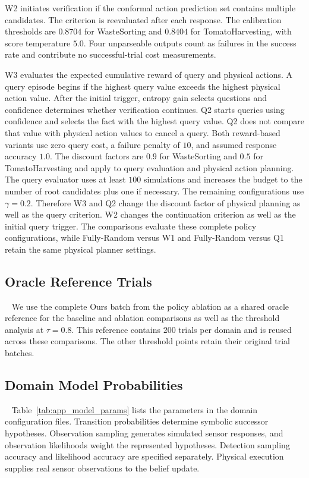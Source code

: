 W2 initiates verification if the conformal action prediction set contains multiple candidates. The criterion is reevaluated after each response. The calibration thresholds are $0.8704$ for WasteSorting and $0.8404$ for TomatoHarvesting, with score temperature $5.0$. Four unparseable outputs count as failures in the success rate and contribute no successful-trial cost measurements.

W3 evaluates the expected cumulative reward of query and physical actions. A query episode begins if the highest query value exceeds the highest physical action value. After the initial trigger, entropy gain selects questions and confidence determines whether verification continues. Q2 starts queries using confidence and selects the fact with the highest query value. Q2 does not compare that value with physical action values to cancel a query. Both reward-based variants use zero query cost, a failure penalty of $10$, and assumed response accuracy $1.0$. The discount factors are $0.9$ for WasteSorting and $0.5$ for TomatoHarvesting and apply to query evaluation and physical action planning. The query evaluator uses at least $100$ simulations and increases the budget to the number of root candidates plus one if necessary. The remaining configurations use $\gamma=0.2$. Therefore W3 and Q2 change the discount factor of physical planning as well as the query criterion. W2 changes the continuation criterion as well as the initial query trigger. The comparisons evaluate these complete policy configurations, while Fully-Random versus W1 and Fully-Random versus Q1 retain the same physical planner settings.

\subsection{Oracle Reference Trials}~\label{appx:oracle_reference}
We use the complete Ours batch from the policy ablation as a shared oracle reference for the baseline and ablation comparisons as well as the threshold analysis at $\tau=0.8$. This reference contains $200$ trials per domain and is reused across these comparisons. The other threshold points retain their original trial batches.

\subsection{Domain Model Probabilities}~\label{appx:model_params}
Table~\ref{tab:app_model_params} lists the parameters in the domain configuration files. Transition probabilities determine symbolic successor hypotheses. Observation sampling generates simulated sensor responses, and observation likelihoods weight the represented hypotheses. Detection sampling accuracy and likelihood accuracy are specified separately. Physical execution supplies real sensor observations to the belief update.

